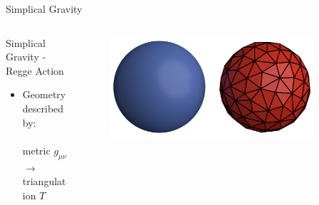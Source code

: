 
\begin{frame}{Simplical Gravity}
 \begin{columns}
  \begin{column}{0.52\textwidth}
   \begin{block}{Simplical Gravity - Regge Action}
    \vspace{0pt}
    \begin{itemize}
     \item Geometry described by:\\
           $\qquad$ metric $g_{\mu\nu}$ $\rightarrow$ triangulation $T$
    \end{itemize}
   \end{block}
  \end{column}
  \begin{column}{0.46\textwidth}
   \begin{figure}
    \centering
    \includegraphics[width=0.9\textwidth]{pics/triangulation-fib.png}
   \end{figure}
  \end{column}
 \end{columns}
\end{frame}

